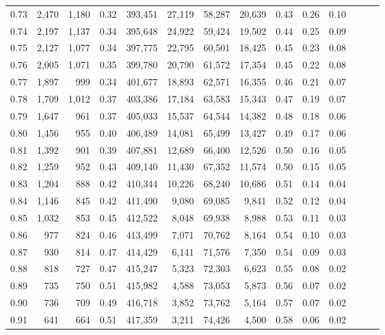 \begin{tabular}{rrrrrrrrrrrrrr}
0.73 &  2,470 &  1,180 &  0.32 &  393,451 &   27,119 &  58,287 &  20,639 &  0.43 &  0.26 &      0.10 \\
0.74 &  2,197 &  1,137 &  0.34 &  395,648 &   24,922 &  59,424 &  19,502 &  0.44 &  0.25 &      0.09 \\
0.75 &  2,127 &  1,077 &  0.34 &  397,775 &   22,795 &  60,501 &  18,425 &  0.45 &  0.23 &      0.08 \\
0.76 &  2,005 &  1,071 &  0.35 &  399,780 &   20,790 &  61,572 &  17,354 &  0.45 &  0.22 &      0.08 \\
0.77 &  1,897 &    999 &  0.34 &  401,677 &   18,893 &  62,571 &  16,355 &  0.46 &  0.21 &      0.07 \\
0.78 &  1,709 &  1,012 &  0.37 &  403,386 &   17,184 &  63,583 &  15,343 &  0.47 &  0.19 &      0.07 \\
0.79 &  1,647 &    961 &  0.37 &  405,033 &   15,537 &  64,544 &  14,382 &  0.48 &  0.18 &      0.06 \\
0.80 &  1,456 &    955 &  0.40 &  406,489 &   14,081 &  65,499 &  13,427 &  0.49 &  0.17 &      0.06 \\
0.81 &  1,392 &    901 &  0.39 &  407,881 &   12,689 &  66,400 &  12,526 &  0.50 &  0.16 &      0.05 \\
0.82 &  1,259 &    952 &  0.43 &  409,140 &   11,430 &  67,352 &  11,574 &  0.50 &  0.15 &      0.05 \\
0.83 &  1,204 &    888 &  0.42 &  410,344 &   10,226 &  68,240 &  10,686 &  0.51 &  0.14 &      0.04 \\
0.84 &  1,146 &    845 &  0.42 &  411,490 &    9,080 &  69,085 &   9,841 &  0.52 &  0.12 &      0.04 \\
0.85 &  1,032 &    853 &  0.45 &  412,522 &    8,048 &  69,938 &   8,988 &  0.53 &  0.11 &      0.03 \\
0.86 &    977 &    824 &  0.46 &  413,499 &    7,071 &  70,762 &   8,164 &  0.54 &  0.10 &      0.03 \\
0.87 &    930 &    814 &  0.47 &  414,429 &    6,141 &  71,576 &   7,350 &  0.54 &  0.09 &      0.03 \\
0.88 &    818 &    727 &  0.47 &  415,247 &    5,323 &  72,303 &   6,623 &  0.55 &  0.08 &      0.02 \\
0.89 &    735 &    750 &  0.51 &  415,982 &    4,588 &  73,053 &   5,873 &  0.56 &  0.07 &      0.02 \\
0.90 &    736 &    709 &  0.49 &  416,718 &    3,852 &  73,762 &   5,164 &  0.57 &  0.07 &      0.02 \\
0.91 &    641 &    664 &  0.51 &  417,359 &    3,211 &  74,426 &   4,500 &  0.58 &  0.06 &      0.02 \\

\end{tabular}
